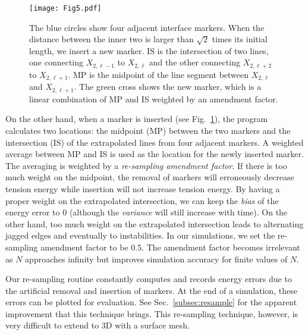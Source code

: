 \documentclass[%
 aip,
 amsmath,amssymb,
 reprint,
 floatfix
]{revtex4-1}
\begin{document}
\begin{figure}
    \centering
    \texttt{[image: Fig5.pdf]}
    \label{fig:young}
    \caption{\footnotesize{
        The blue circles show four adjacent interface markers. When the distance between the inner two is larger than $\sqrt{2}$ times its initial length, we insert a new marker. IS is the intersection of two lines, one connecting $X_{2,\ell-1}$ to $X_{2,\ell}$ and the other connecting $X_{2,\ell+2}$ to $X_{2,\ell+1}$. MP is the midpoint of the line segment between $X_{2,\ell}$ and $X_{2,\ell+1}$. The green cross shows the new marker, which is a linear combination of MP and IS weighted by an amendment factor. 
    }}
    \label{fig:add-marker}
\end{figure}
On the other hand, when a marker is inserted (see Fig.~\ref{fig:add-marker}), the program calculates two locations: the midpoint (MP) between the two markers and the intersection (IS) of the extrapolated lines from four adjacent markers. A weighted average between MP and IS is used as the location for the newly inserted marker. The averaging is weighted by a \textit{re-sampling amendment factor}. If there is too much weight on the midpoint, the removal of markers will erroneously decrease tension energy while insertion will not increase tension energy. By having a proper weight on the extrapolated intersection, we can keep the \textit{bias} of the energy error to $0$ (although the \textit{variance} will still increase with time). On the other hand, too much weight on the extrapolated intersection leads to alternating jagged edges and eventually to instabilities. In our simulations, we set the re-sampling amendment factor to be $0.5$. The amendment factor becomes irrelevant as $N$ approaches infinity but improves simulation accuracy for finite values of $N$.

Our re-sampling routine constantly computes and records energy errors due to the artificial removal and insertion of markers. At the end of a simulation, these errors can be plotted for evaluation. See Sec.~\ref{subsec:resample} for the apparent improvement that this technique brings. This re-sampling technique, however, is very difficult to extend to 3D with a surface mesh.  
\end{document}

